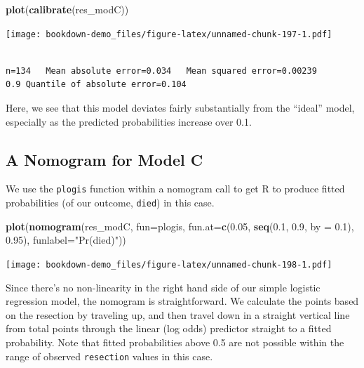 \documentclass[]{book}
\newenvironment{Shaded}{\begin{snugshade}}{\end{snugshade}}
\newcommand{\KeywordTok}[1]{\textcolor[rgb]{0.13,0.29,0.53}{\textbf{#1}}}
\newcommand{\DataTypeTok}[1]{\textcolor[rgb]{0.13,0.29,0.53}{#1}}
\newcommand{\FloatTok}[1]{\textcolor[rgb]{0.00,0.00,0.81}{#1}}
\newcommand{\StringTok}[1]{\textcolor[rgb]{0.31,0.60,0.02}{#1}}
\newcommand{\NormalTok}[1]{#1}
\theoremstyle{definition}
\theoremstyle{definition}
\theoremstyle{definition}
\theoremstyle{remark}
\begin{document}
\begin{Shaded}
\begin{Highlighting}[]
\KeywordTok{plot}\NormalTok{(}\KeywordTok{calibrate}\NormalTok{(res_modC))}
\end{Highlighting}
\end{Shaded}

\texttt{[image: bookdown-demo\_files/figure-latex/unnamed-chunk-197-1.pdf]}

\begin{verbatim}

n=134   Mean absolute error=0.034   Mean squared error=0.00239
0.9 Quantile of absolute error=0.104
\end{verbatim}

Here, we see that this model deviates fairly substantially from the
``ideal'' model, especially as the predicted probabilities increase over
0.1.

\subsection{A Nomogram for Model C}\label{a-nomogram-for-model-c}

We use the \texttt{plogis} function within a nomogram call to get R to
produce fitted probabilities (of our outcome, \texttt{died}) in this
case.

\begin{Shaded}
\begin{Highlighting}[]
\KeywordTok{plot}\NormalTok{(}\KeywordTok{nomogram}\NormalTok{(res_modC, }\DataTypeTok{fun=}\NormalTok{plogis, }
              \DataTypeTok{fun.at=}\KeywordTok{c}\NormalTok{(}\FloatTok{0.05}\NormalTok{, }\KeywordTok{seq}\NormalTok{(}\FloatTok{0.1}\NormalTok{, }\FloatTok{0.9}\NormalTok{, }\DataTypeTok{by =} \FloatTok{0.1}\NormalTok{), }\FloatTok{0.95}\NormalTok{), }
              \DataTypeTok{funlabel=}\StringTok{"Pr(died)"}\NormalTok{))}
\end{Highlighting}
\end{Shaded}

\texttt{[image: bookdown-demo\_files/figure-latex/unnamed-chunk-198-1.pdf]}

Since there's no non-linearity in the right hand side of our simple
logistic regression model, the nomogram is straightforward. We calculate
the points based on the resection by traveling up, and then travel down
in a straight vertical line from total points through the linear (log
odds) predictor straight to a fitted probability. Note that fitted
probabilities above 0.5 are not possible within the range of observed
\texttt{resection} values in this case.
\end{document}
